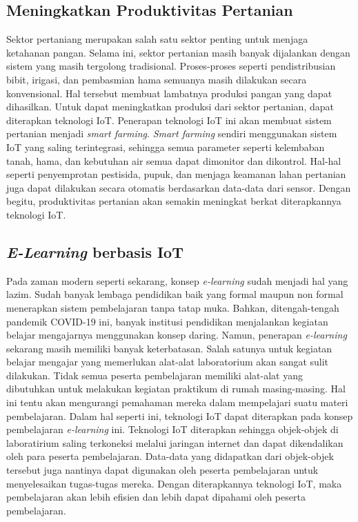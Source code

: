 \documentclass[12pt, letterpaper]{article}
\begin{document}
\subsection{Meningkatkan Produktivitas Pertanian}
Sektor pertaniang merupakan salah satu sektor penting untuk menjaga ketahanan pangan. Selama ini, sektor pertanian masih banyak dijalankan dengan sistem yang masih tergolong tradisional. Proses-proses seperti pendistribusian bibit, irigasi, dan pembasmian hama semuanya masih dilakukan secara konvensional. Hal tersebut membuat lambatnya produksi pangan yang dapat dihasilkan.
\newline
\indent
Untuk dapat meningkatkan produksi dari sektor pertanian, dapat diterapkan teknologi IoT. Penerapan teknologi IoT ini akan membuat sistem pertanian menjadi \textit{smart farming}. \textit{Smart farming} sendiri menggunakan sistem IoT yang saling terintegrasi, sehingga semua parameter seperti kelembaban tanah, hama, dan kebutuhan air semua dapat dimonitor dan dikontrol. Hal-hal seperti penyemprotan pestisida, pupuk, dan menjaga keamanan lahan pertanian juga dapat dilakukan secara otomatis
berdasarkan data-data dari sensor. Dengan begitu, produktivitas pertanian akan semakin meningkat berkat diterapkannya teknologi IoT.\cite{iemcon17} 
\newline
\subsection{\textit{E-Learning} berbasis IoT}
Pada zaman modern seperti sekarang, konsep \textit{e-learning} sudah menjadi hal yang lazim. Sudah banyak lembaga pendidikan baik yang formal maupun non formal menerapkan sistem pembelajaran tanpa tatap muka. Bahkan, ditengah-tengah pandemik COVID-19 ini, banyak institusi pendidikan menjalankan kegiatan belajar mengajarnya menggunakan konsep daring.
\newline
\indent
Namun, penerapan \textit{e-learning} sekarang masih memiliki banyak keterbatasan. Salah satunya untuk kegiatan belajar mengajar yang memerlukan alat-alat laboratorium akan sangat sulit dilakukan. Tidak semua peserta pembelajaran memiliki alat-alat yang dibutuhkan untuk melakukan kegiatan praktikum di rumah masing-masing. Hal ini tentu akan mengurangi pemahaman mereka dalam mempelajari suatu materi pembelajaran.
\newline
\indent
Dalam hal seperti ini, teknologi IoT dapat diterapkan pada konsep pembelajaran \textit{e-learning} ini. Teknologi IoT diterapkan sehingga objek-objek di laboratirium saling terkoneksi melalui jaringan internet dan dapat dikendalikan oleh para peserta pembelajaran. \cite{ijdr17} Data-data yang didapatkan dari objek-objek tersebut juga nantinya dapat digunakan oleh peserta pembelajaran untuk menyelesaikan tugas-tugas mereka. Dengan diterapkannya teknologi IoT, maka pembelajaran akan lebih
efisien dan lebih dapat dipahami oleh peserta pembelajaran.

\newpage
\printbibliography[title=Daftar Pustaka]
\end{document}
